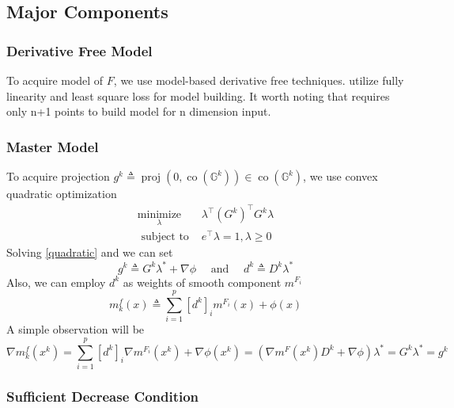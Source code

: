 \documentclass[10pt, oneside]{article}
\begin{document}
\subsection{Major Components}

\subsubsection{Derivative Free Model}

To acquire model of $F$, we use model-based derivative free techniques. \cite{dfols} utilize fully linearity and least square loss for model building. It worth noting that \cite{dfols} requires only n+1 points to build model for n dimension input. 

\subsubsection{Master Model}

To acquire projection $g^{k} \triangleq \operatorname{proj}\left(0, \operatorname{co}\left(\mathbb{G}^{k}\right)\right) \in \operatorname{co}\left(\mathbb{G}^{k}\right)$, we use convex quadratic optimization 
\begin{equation}
\label{quadratic}
\begin{array}{ll}
\underset{\lambda}{\operatorname{minimize}} & \lambda^{\top}\left(G^{k}\right)^{\top} G^{k} \lambda \\
\text { subject to } & e^{\top} \lambda=1, \lambda \geq 0
\end{array}
\end{equation}
Solving \ref{quadratic} and we can set 
\begin{equation}
\label{gandd}
g^{k} \triangleq G^{k} \lambda^{*} +\nabla\phi \quad \text { and } \quad d^{k} \triangleq D^{k} \lambda^{*}
\end{equation}
Also, we can employ $d^k$ as weights of smooth component $m^{F_i}$
$$
m_{k}^{f}(x) \triangleq \sum_{i=1}^{p}\left[d^{k}\right]_{i} m^{F_{i}}(x)+\phi(x)
$$
A simple observation will be 
$$
\nabla m_{k}^{f}\left(x^{k}\right)=\sum_{i=1}^{p}\left[d^{k}\right]_{i} \nabla m^{F_{i}}\left(x^{k}\right)+\nabla \phi(x^k)=\left(\nabla m^F\left(x^{k}\right) D^{k} +\nabla \phi\right)\lambda^{*}=G^{k} \lambda^{*}=g^{k}
$$

\subsubsection{Sufficient Decrease Condition}
\end{document}

